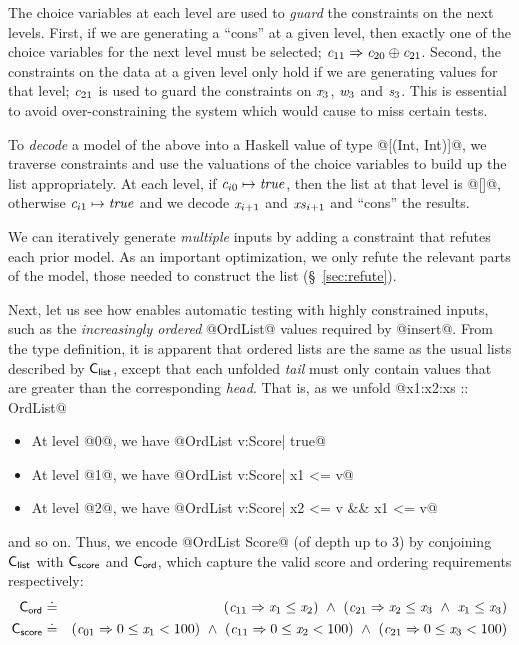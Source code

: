 The choice variables at each level are used to \emph{guard} the 
constraints on the next levels. 
%
First, if we are generating a ``cons'' at a given level, then
exactly one of the choice variables for the next level must be 
selected;
\eg  $\mathit{{c}}_{11} \Rightarrow \mathit{{c}}_{20} \oplus \mathit{{c}}_{21}$.
%
Second, the constraints on the data at a given level only hold 
if we are generating values for that level; \eg $\mathit{{c}}_{21}$ 
is used to guard the constraints on $\mathit{{x}}_3$, $\mathit{{w}}_3$ 
and $\mathit{{s}}_3$.
%
This is essential to avoid over-constraining the system 
which would cause \toolname to miss certain tests.

To \emph{decode} a model of the above into a Haskell value of type @[(Int, Int)]@,
we traverse constraints and use the valuations of the choice variables to 
build up the list appropriately.
%
At each level, if $\mathit{{c}}_{i0} \mapsto \mathit{{true}}$, then the list at that 
level is @[]@, otherwise $\mathit{{c}}_{i1} \mapsto \mathit{{true}}$ and we decode 
$\mathit{{x}}_{i+1}$ and $\mathit{{xs}}_{i+1}$ and ``cons'' the results.

We can iteratively generate \emph{multiple} inputs by adding a constraint that
refutes each prior model. As an important optimization, we only refute the
relevant parts of the model, \ie those needed to construct the list
(\S~\ref{sec:refute}).

%
Next, let us see how \toolname enables automatic testing with 
highly constrained inputs, such as the \emph{increasingly ordered} 
@OrdList@ values required by @insert@.
%
From the type definition, it is apparent that ordered
lists are the same as the usual lists described by
$\mathsf{{C_{list}}}$, except that each unfolded \emph{tail} 
must only contain values that are greater than the 
corresponding \emph{head}.
%
That is, as we unfold @x1:x2:xs :: OrdList@ 
%
\begin{itemize}
\item At level @0@, we have @OrdList {v:Score| true}@
\item At level @1@, we have @OrdList {v:Score| x1 <= v}@
\item At level @2@, we have @OrdList {v:Score| x2 <= v && x1 <= v}@
\end{itemize}
%
and so on. Thus, we encode @OrdList Score@ (of depth up to 3) by
conjoining $\mathsf{{C_{list}}}$ with  $\mathsf{{C_{score}}}$ and $\mathsf{{C_{ord}}}$,
which capture the valid score and ordering requirements respectively:
%
\begin{eqnarray*}
\mathsf{{C_{ord}}}   & \doteq & (\mathit{{c}}_{11} \Rightarrow \mathit{{x}}_1 \leq \mathit{{x}}_2)
                \ \wedge\  (\mathit{{c}}_{21} \Rightarrow \mathit{{x}}_2 \leq \mathit{{x}}_3\ \wedge\ \mathit{{x}}_1 \leq \mathit{{x}}_3) \\[0.01in]
\mathsf{{C_{score}}} & \doteq & (\mathit{{c}}_{01} \Rightarrow 0 \leq \mathit{{x}}_1 < 100)
                \ \wedge\  (\mathit{{c}}_{11} \Rightarrow 0 \leq \mathit{{x}}_2 < 100)
                \ \wedge\  (\mathit{{c}}_{21} \Rightarrow 0 \leq \mathit{{x}}_3 < 100)
\end{eqnarray*}

